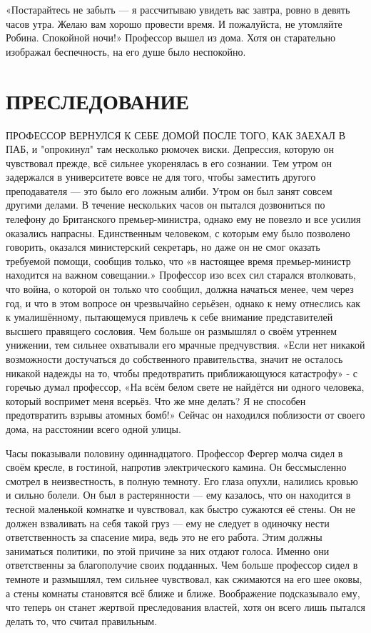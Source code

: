 \documentclass[a4paper,12pt]{book}
\begin{document}
	«Постарайтесь не забыть — я рассчитываю увидеть вас завтра, ровно в девять часов утра. Желаю вам хорошо провести время. И пожалуйста, не утомляйте Робина. Спокойной ночи!»
	Профессор вышел из дома. Хотя он старательно изображал беспечность, на его душе было неспокойно.

\chapter{ПРЕСЛЕДОВАНИЕ}
	ПРОФЕССОР ВЕРНУЛСЯ К СЕБЕ ДОМОЙ ПОСЛЕ ТОГО, КАК ЗАЕХАЛ В ПАБ, и "опрокинул" там несколько рюмочек виски. Депрессия, которую он чувствовал прежде, всё сильнее укоренялась в его сознании.
	Тем утром он задержался в университете вовсе не для того, чтобы заместить другого преподавателя — это было его ложным алиби.
	Утром он был занят совсем другими делами.
	В течение нескольких часов он пытался дозвониться по телефону до Британского премьер-министра, однако ему не повезло и все усилия оказались напрасны.
	 Единственным человеком, с которым ему было позволено говорить, оказался министерский секретарь, но даже он не смог оказать требуемой помощи, сообщив только, что «в настоящее время премьер-министр находится на важном совещании.»
	Профессор изо всех сил старался втолковать, что война, о которой он только что сообщил, должна начаться менее, чем через год, и что в этом вопросе он чрезвычайно серьёзен, однако к нему отнеслись как к умалишённому, пытающемуся привлечь к себе внимание представителей высшего правящего сословия. Чем больше он размышлял о своём утреннем унижении, тем сильнее охватывали его мрачные предчувствия.
	«Если нет никакой возможности достучаться до собственного правительства, значит не осталось никакой надежды на то, чтобы предотвратить приближающуюся катастрофу» - с горечью думал профессор,
	«На всём белом свете не найдётся ни одного человека, который воспримет меня всерьёз. Что же мне делать? Я не способен предотвратить взрывы атомных бомб!»
	Сейчас он находился поблизости от своего дома, на расстоянии всего одной улицы.

	Часы показывали половину одиннадцатого. Профессор Фергер молча сидел в своём кресле, в гостиной, напротив электрического камина. Он бессмысленно смотрел в неизвестность, в полную темноту. Его глаза опухли, налились кровью и сильно болели.
	Он был в растерянности — ему казалось, что он находится в тесной маленькой комнатке и чувствовал, как быстро сужаются её стены. Он не должен взваливать на себя такой груз — ему не следует в одиночку нести ответственность за спасение мира, ведь это не его работа. Этим должны заниматься политики, по этой причине за них отдают голоса. Именно они ответственны за благополучие своих подданных.
	Чем больше профессор сидел в темноте и размышлял, тем сильнее чувствовал, как сжимаются на его шее оковы, а стены комнаты становятся всё ближе и ближе. Воображение подсказывало ему, что теперь он станет жертвой преследования властей, хотя он всего лишь пытался делать то, что считал правильным.
	
\end{document}
